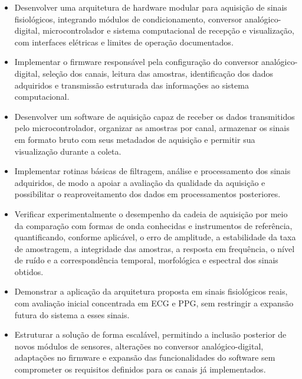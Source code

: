 \documentclass[a4paper,12pt]{fcte}
\begin{document}
\begin{itemize}
    \item Desenvolver uma arquitetura de hardware modular para aquisição de sinais fisiológicos, integrando módulos de condicionamento, conversor analógico-digital, microcontrolador e sistema computacional de recepção e visualização, com interfaces elétricas e limites de operação documentados.

    \item Implementar o firmware responsável pela configuração do conversor analógico-digital, seleção dos canais, leitura das amostras, identificação dos dados adquiridos e transmissão estruturada das informações ao sistema computacional.

    \item Desenvolver um software de aquisição capaz de receber os dados transmitidos pelo microcontrolador, organizar as amostras por canal, armazenar os sinais em formato bruto com seus metadados de aquisição e permitir sua visualização durante a coleta.

    \item Implementar rotinas básicas de filtragem, análise e processamento dos sinais adquiridos, de modo a apoiar a avaliação da qualidade da aquisição e possibilitar o reaproveitamento dos dados em processamentos posteriores.

    \item Verificar experimentalmente o desempenho da cadeia de aquisição por meio da comparação com formas de onda conhecidas e instrumentos de referência, quantificando, conforme aplicável, o erro de amplitude, a estabilidade da taxa de amostragem, a integridade das amostras, a resposta em frequência, o nível de ruído e a correspondência temporal, morfológica e espectral dos sinais obtidos.

    \item Demonstrar a aplicação da arquitetura proposta em sinais fisiológicos reais, com avaliação inicial concentrada em ECG e PPG, sem restringir a expansão futura do sistema a esses sinais.

    \item Estruturar a solução de forma escalável, permitindo a inclusão posterior de novos módulos de sensores, alterações no conversor analógico-digital, adaptações no firmware e expansão das funcionalidades do software sem comprometer os requisitos definidos para os canais já implementados.
\end{itemize}


\end{document}
